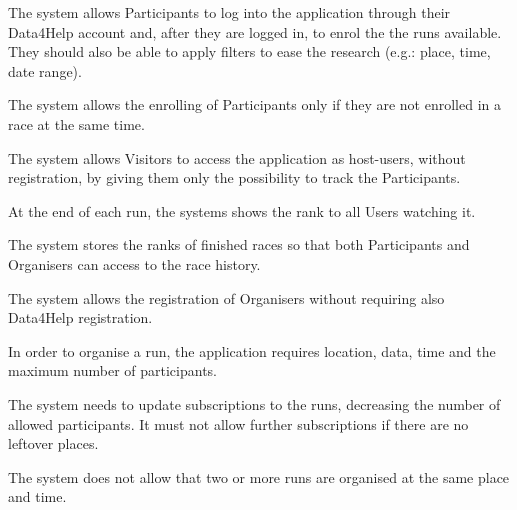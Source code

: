 \begin{enumerate}[label={[}R3.\arabic*{]}, leftmargin=*]

    \item \label{R3-login-enrollin} The system allows Participants to log into the application through their Data4Help account and, after they are logged in, to enrol the the runs available. They should also be able to apply filters to ease the research (e.g.: place, time, date range).
    
    \item \label{R3-enrolling-different-time} The system allows the enrolling of Participants only if they are not enrolled in a race at the same time.
    
    \item \label{R3-visitors} The system allows Visitors to access the application as host-users, without registration, by giving them only the possibility to track the Participants.
    
    \item \label{R3-ranking-end} At the end of each run, the systems shows the rank to all Users watching it.
    
    \item \label{R3-ranking-storage} The system stores the ranks of finished races so that both Participants and Organisers can access to the race history.
    
    \item \label{R3-organizer-registration} The system allows the registration of Organisers without requiring also Data4Help registration.
    
    \item \label{R3-run-organization} In order to organise a run, the application requires location, data, time and the maximum number of participants.
    
    \item \label{R3-decreasing-participant-number} The system needs to update subscriptions to the runs, decreasing the number of allowed participants. It must not allow further subscriptions if there are no leftover places.
    
    \item \label{R3-run-different-time} The system does not allow that two or more runs are organised at the same place and time.

\end{enumerate}